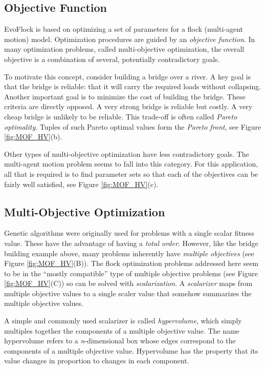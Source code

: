 \documentclass[letterpaper]{article}
\begin{document}
\subsection{Objective Function}
\label{subsec:ObjectiveFunction}

EvoFlock is based on optimizing a set of parameters for a flock (multi-agent motion) model. Optimization procedures are guided by an \textit{objective function}. In many optimization problems, called multi-objective optimization, the overall objective is a combination of several, potentially contradictory goals. 

To motivate this concept, consider building a bridge over a river. A key goal is that the bridge is reliable: that it will carry the required loads without collapsing. Another important goal is to minimize the cost of building the bridge. These criteria are directly opposed. A very strong bridge is reliable but costly. A very cheap bridge is unlikely to be reliable. This trade-off is often called \textit{Pareto optimality}. Tuples of such Pareto optimal values form the \textit{Pareto front}, see Figure \ref{fig:MOF_HV}(b).

Other types of multi-objective optimization have less contradictory goals. The multi-agent motion problem seems to fall into this category. For this application, all that is required is to find parameter sets so that each of the objectives can be fairly well satisfied, see Figure \ref{fig:MOF_HV}(c).


\subsection{Multi-Objective Optimization}
\label{subsec:Multi-Objective}

Genetic algorithms were originally used for problems with a single scalar fitness value. These have the advantage of having a \textit{total order}. However, like the bridge building example above, many problems inherently have \textit{multiple objectives} (see Figure \ref{fig:MOF_HV}(B)). The flock optimization problems addressed here seem to be in the ``mostly compatible'' type of multiple objective problems (see Figure \ref{fig:MOF_HV}(C)) so can be solved with \textit{scalarization}. A \textit{scalarizer} maps from multiple objective values to a single scaler value that somehow summarizes the multiple objective values.

A simple and commonly used scalarizer is called \textit{hypervolume}, which simply multiples together the components of a multiple objective value. The name hypervolume refers to a \textit{n}-dimensional box whose edges correspond to the components of a multiple objective value. Hypervolume has the property that its value changes in proportion to changes in each component.
\end{document}
